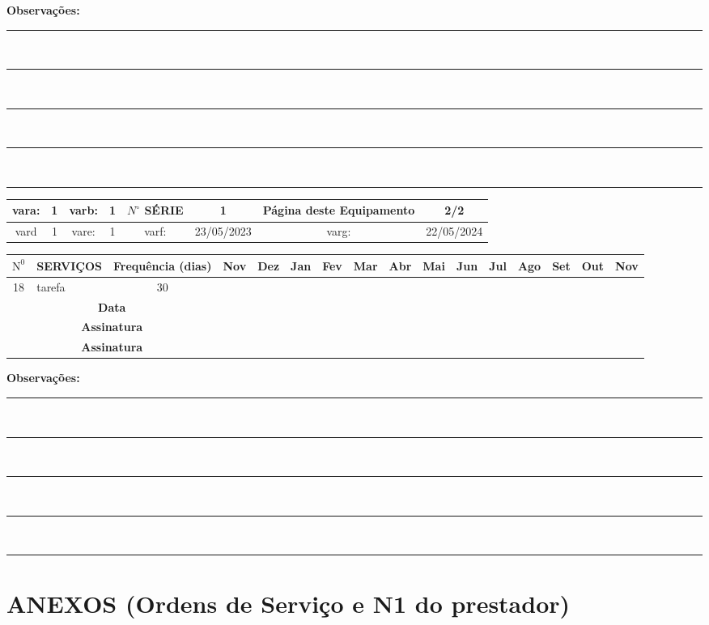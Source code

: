 \documentclass[a4paper, 12pt]{article}
\begin{document}
\footnotesize\textbf{Observações:}\\[0.1cm]
\noindent\rule{\textwidth}{0.2mm} \\[0.1cm]
\noindent\rule{\textwidth}{0.2mm} \\[0.1cm]
\noindent\rule{\textwidth}{0.2mm} \\[0.1cm]
\noindent\rule{\textwidth}{0.2mm} \\[0.1cm]
\noindent\rule{\textwidth}{0.2mm}




\newpage
\begin{adjustbox}{width=18cm ,center}
\begin{tabular}{|c|c|c|c|c|c|c|c|}
\hline vara: & 1 & varb: & 1 & $N^{\circ}$ SÉRIE & 1 & \textbf{Página deste Equipamento} & \textbf{2/2} \\
\hline vard & 1 & vare: & 1 & varf: & 23/05/2023 & varg: & 22/05/2024 \\
\hline
\end{tabular}
\end{adjustbox}

\begin{adjustbox}{width=18cm ,center}
\begin{tabular}{|c|p{12cm}|c|c|c|c|c|c|c|c|c|c|c|c|c|c|}
\hline $\mathrm{N}^0$ & SERVIÇOS & Frequência (dias) & Nov & Dez & Jan & Fev & Mar & Abr & Mai & Jun & Jul & Ago & Set & Out & Nov \\
\hline 18 & tarefa & 30 & & & & & & & & & & & & & \\
\hline
\multicolumn{3}{|c|}{\textbf{Data }} &  & & & & & & & &  &  & &  &  \\
\hline \multicolumn{3}{|c|}{\textbf{Assinatura }} &  & & & & & & & & & &   &  &  \\
\hline \multicolumn{3}{|c|}{\textbf{Assinatura }} &  & & & & & & & & & &   &  &  \\
\hline
\end{tabular}
\end{adjustbox}


\footnotesize\textbf{Observações:}\\[0.1cm]
\noindent\rule{\textwidth}{0.2mm} \\[0.1cm]
\noindent\rule{\textwidth}{0.2mm} \\[0.1cm]
\noindent\rule{\textwidth}{0.2mm} \\[0.1cm]
\noindent\rule{\textwidth}{0.2mm} \\[0.1cm]
\noindent\rule{\textwidth}{0.2mm}
\newpage
\newpage
\section{ANEXOS (Ordens de Serviço e N1 do prestador)}
\end{document}
